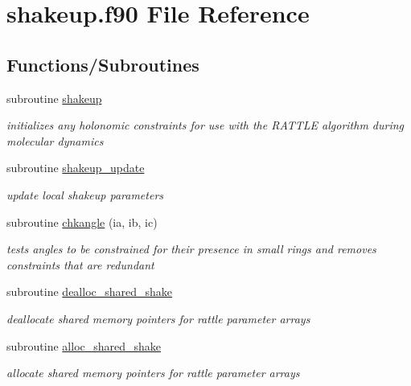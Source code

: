 \hypertarget{shakeup_8f90}{\section{shakeup.\-f90 File Reference}
\label{shakeup_8f90}
}
\subsection*{Functions/\-Subroutines}
\begin{DoxyCompactItemize}
\item 
subroutine \hyperlink{shakeup_8f90_a31acd11cea25519cd3686c92296a70c3}{shakeup}
\begin{DoxyCompactList}\small\item\em initializes any holonomic constraints for use with the R\-A\-T\-T\-L\-E algorithm during molecular dynamics \end{DoxyCompactList}\item 
subroutine \hyperlink{shakeup_8f90_a1f3c3f2c1f30c2484a354bdfe9430549}{shakeup\-\_\-update}
\begin{DoxyCompactList}\small\item\em update local shakeup parameters \end{DoxyCompactList}\item 
subroutine \hyperlink{shakeup_8f90_a095c1b44548c59261cf1acb588a4ea0c}{chkangle} (ia, ib, ic)
\begin{DoxyCompactList}\small\item\em tests angles to be constrained for their presence in small rings and removes constraints that are redundant \end{DoxyCompactList}\item 
subroutine \hyperlink{shakeup_8f90_ae0508af519165261c68531719e5c2803}{dealloc\-\_\-shared\-\_\-shake}
\begin{DoxyCompactList}\small\item\em deallocate shared memory pointers for rattle parameter arrays \end{DoxyCompactList}\item 
subroutine \hyperlink{shakeup_8f90_a18eb5d657764060c65b5c427d0646be1}{alloc\-\_\-shared\-\_\-shake}
\begin{DoxyCompactList}\small\item\em allocate shared memory pointers for rattle parameter arrays \end{DoxyCompactList}\end{DoxyCompactItemize}



